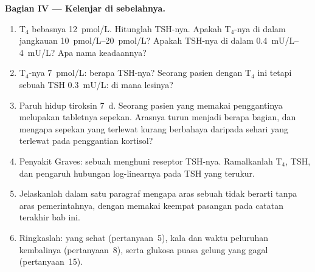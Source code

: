 \begin{problem}
\medskip
\noindent\textbf{Bagian IV --- Kelenjar di sebelahnya.}
\begin{enumerate}[resume]
  \item T$_{4}$ bebasnya \qty{12}{pmol/L}. Hitunglah TSH-nya. Apakah T$_{4}$-nya di dalam
        jangkauan \qtyrange{10}{20}{pmol/L}? Apakah TSH-nya di dalam
        \qtyrange{0.4}{4}{mU/L}? Apa nama keadaannya?
  \item T$_{4}$-nya \qty{7}{pmol/L}: berapa TSH-nya? Seorang pasien dengan T$_{4}$ ini tetapi
        sebuah TSH \qty{0.3}{mU/L}: di mana lesinya?
  \item Paruh hidup tiroksin \qty{7}{d}. Seorang pasien yang memakai penggantinya
        melupakan tabletnya sepekan. Arasnya turun menjadi berapa bagian,
        dan mengapa sepekan yang terlewat kurang berbahaya daripada sehari yang terlewat pada
        penggantian kortisol?
  \item Penyakit Graves: sebuah  menghuni reseptor TSH-nya. Ramalkanlah
        T$_{4}$, TSH, dan pengaruh hubungan log-linearnya pada
        TSH yang terukur.
  \item Jelaskanlah dalam satu paragraf mengapa aras sebuah  tidak berarti
        tanpa aras pemerintahnya, dengan memakai keempat pasangan pada catatan
        terakhir bab ini.
  \item Ringkaslah:  yang sehat (pertanyaan~5), kala dan
        waktu peluruhan kembalinya (pertanyaan~8), serta glukosa puasa
        gelung yang gagal (pertanyaan~15).
\end{enumerate}
\end{problem}
